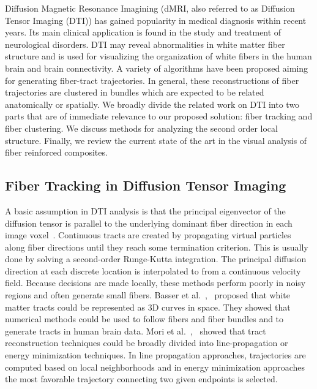 Diffusion Magnetic Resonance Imagining (dMRI, also referred to as Diffusion Tensor Imaging (DTI)) has gained popularity in medical diagnosis within recent years. Its main clinical application is found in the study and treatment of neurological disorders. DTI may reveal abnormalities in white matter fiber structure and is used for visualizing the organization of white fibers in the human brain and  brain connectivity.
A variety of algorithms have been proposed aiming for generating fiber-tract trajectories. In general, these reconstructions of fiber trajectories are  clustered in bundles which are expected to be related anatomically or spatially. 
We broadly divide the related work on DTI into two parts that are of immediate relevance to our proposed solution: fiber tracking and fiber clustering. We discuss  methods for analyzing the second order local structure. Finally, we review the current state of the art in the visual analysis of fiber reinforced composites.


\subsection {Fiber Tracking in Diffusion Tensor Imaging}
\label{subsec:fiberEx} 
A basic assumption in DTI analysis is that the principal eigenvector of the diffusion tensor is parallel to the underlying dominant fiber direction in each image voxel~\cite{Basser2002, Basser2000, Mori1999, Mori2002}. Continuous tracts are created by propagating virtual particles along fiber directions until they reach some termination criterion. 
 This is usually done by solving a second-order Runge-Kutta integration. The principal diffusion direction at each discrete location is interpolated to from a continuous velocity field. 
 Because decisions are made locally, these methods perform poorly in noisy regions and often generate small fibers. Basser et al.~\cite{Basser2000},~\cite{Basser2002} proposed that white matter tracts could be represented as 3D curves in space. They showed that numerical methods could be used to follow fibers and fiber bundles and to generate tracts in human brain data. 
Mori et al.~\cite{Mori1999},~\cite{Mori2002} showed that tract reconstruction techniques could be broadly divided into line-propagation or energy minimization techniques. In line propagation approaches, trajectories are computed based on local neighborhoods and in energy minimization approaches the most  favorable trajectory connecting two given endpoints is selected. 


